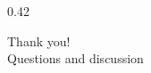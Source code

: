 \STANDARD{}
{
  \begin{columns}
    \begin{column}{0.42\textwidth}
      \begin{block}{}
        \centering
        Thank you!\\
        Questions and discussion
      \end{block}
    \end{column}
  \end{columns}
}
